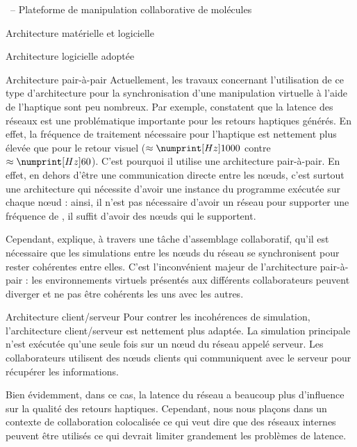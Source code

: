 \documentclass[myfrancais,ngerman,english,french]{mythesis}
\begin{document}
\begin{mychapter}{\myShaddock\ -- Plateforme de manipulation collaborative de molécules}
\begin{mysection}{Architecture matérielle et logicielle}
\begin{mysubsection}{Architecture logicielle adoptée}
\begin{mysubsubsection}{Architecture pair-à-pair}
					Actuellement, les travaux concernant l'utilisation de ce type d'architecture pour la synchronisation d'une manipulation virtuelle à l'aide de l'haptique sont peu nombreux.
					Par exemple,  constatent que la latence des réseaux est une problématique importante pour les retours haptiques générés.
					En effet, la fréquence de traitement nécessaire pour l'haptique est nettement plus élevée que pour le retour visuel ($\approx \mynum[Hz]{1000}$ contre $\approx \mynum[Hz]{60}$).
					C'est pourquoi il utilise une architecture pair-à-pair.
					En effet, en dehors d'être une communication directe entre les nœuds, c'est surtout une architecture qui nécessite d'avoir une instance du programme exécutée sur chaque nœud : ainsi, il n'est pas nécessaire d'avoir un réseau pour supporter une fréquence de , il suffit d'avoir des nœuds qui le supportent.

					Cependant,  explique, à travers une tâche d'assemblage collaboratif, qu'il est nécessaire que les simulations entre les nœuds du réseau se synchronisent pour rester cohérentes entre elles.
					C'est l'inconvénient majeur de l'architecture pair-à-pair : les environnements virtuels présentés aux différents collaborateurs peuvent diverger et ne pas être cohérents les uns avec les autres.
				\end{mysubsubsection}
				\begin{mysubsubsection}{Architecture client/serveur}
					Pour contrer les incohérences de simulation, l'architecture client/serveur est nettement plus adaptée.
					La simulation principale n'est exécutée qu'une seule fois sur un nœud du réseau appelé serveur.
					Les collaborateurs utilisent des nœuds clients qui communiquent avec le serveur pour récupérer les informations.

					Bien évidemment, dans ce cas, la latence du réseau a beaucoup plus d'influence sur la qualité des retours haptiques.
					Cependant, nous nous plaçons dans un contexte de collaboration colocalisée ce qui veut dire que des réseaux internes peuvent être utilisés ce qui devrait limiter grandement les problèmes de latence.


\end{mysubsubsection}
\end{mysubsection}
\end{mysection}
\end{mychapter}
\end{document}
